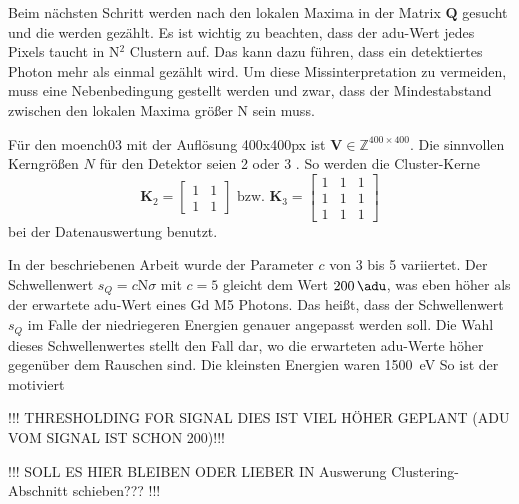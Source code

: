 \noindent
Beim nächsten Schritt werden nach den lokalen Maxima in der Matrix $\mathbf{Q}$ gesucht und die werden gezählt. Es ist wichtig zu beachten, dass der \gls{adu}-Wert jedes Pixels taucht in N$^2$ Clustern auf. Das kann dazu führen, dass ein detektiertes Photon mehr als einmal gezählt wird. Um diese Missinterpretation zu vermeiden, muss eine Nebenbedingung gestellt werden und zwar, dass der Mindestabstand zwischen den lokalen Maxima größer N sein muss.

\noindent
Für den \gls{moench03} mit der Auflösung 400x400px ist $\mathbf{V} \in \mathbb{Z}^{400\times 400}$. Die sinnvollen Kerngrößen $N$ für den Detektor seien 2 oder 3 \cite[Abschnitt 4]{cartier_micron_2014}. So werden die Cluster-Kerne
\begin{equation}
    \mathbf{K}_{2} = \begin{bmatrix}
1 & 1\\
1 & 1
\end{bmatrix}
\text{ bzw. }
    \mathbf{K}_{3} = \begin{bmatrix}
1 & 1 & 1\\
1 & 1 & 1\\
1 & 1 & 1
\end{bmatrix}
\end{equation}
bei der Datenauswertung benutzt.

\noindent
In der beschriebenen Arbeit wurde der Parameter $c$ von 3 bis 5 variiertet. Der Schwellenwert $s_Q = c\text{N}\sigma$ mit $c=5$ gleicht dem Wert $\SI{200}{\adu}$, was eben höher als der erwartete \gls{adu}-Wert eines Gd M5 Photons. Das heißt, dass der Schwellenwert $s_Q$ im Falle der niedriegeren Energien genauer angepasst werden soll.
Die Wahl dieses Schwellenwertes stellt den Fall dar, wo die erwarteten \gls{adu}-Werte höher gegenüber dem Rauschen sind. Die kleinsten Energien waren \SI{1500}{\eV} So ist der motiviert


!!! THRESHOLDING FOR SIGNAL DIES IST VIEL HÖHER GEPLANT (ADU VOM SIGNAL IST SCHON 200)!!!

!!! SOLL ES HIER BLEIBEN ODER LIEBER IN Auswerung Clustering-Abschnitt schieben??? !!!